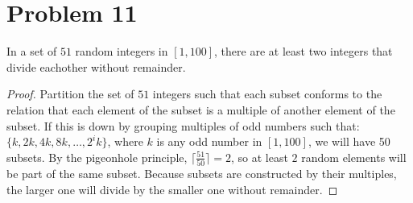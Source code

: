 \documentclass{article}
\newenvironment{problem}[1]{
  \nobreak\section*{Problem #1}
}{}
\begin{document}
  \begin{problem}{11}
    \begin{theorem}
      In a set of $51$ random integers in $[1, 100]$, there are at least two integers
      that divide eachother without remainder.
    \end{theorem}

    \begin{proof}
      Partition the set of $51$ integers such that each subset conforms to
      the relation that each element of the subset is a multiple of another
      element of the subset.  If this is down by grouping multiples of odd
      numbers such that: $\{k, 2k, 4k, 8k, \dotsc , 2^ik\}$, where $k$ is
      any odd number in $[1, 100]$, we will have 50 subsets.  By the 
      pigeonhole principle, $\lceil \frac{51}{50} \rceil = 2$, so at least
      $2$ random elements will be part of the same subset.  Because subsets
      are constructed by their multiples, the larger one will divide by the 
      smaller one without remainder.
    \end{proof}
  \end{problem}
\end{document}
